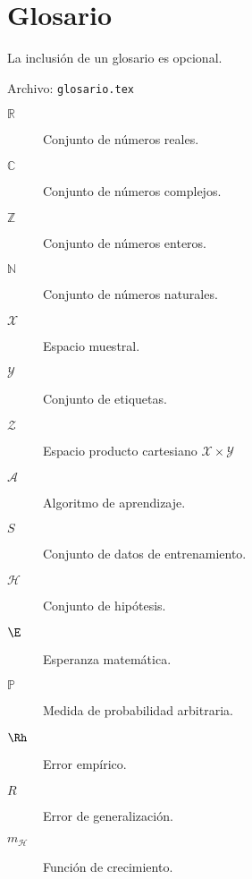 
\chapter*{Glosario}

La inclusión de un glosario es opcional.

Archivo: \texttt{glosario.tex}

\begin{description} 
  \item[$\mathbb{R}$] Conjunto de números reales.

  \item[$\mathbb{C}$] Conjunto de números complejos.

  \item[$\mathbb{Z}$] Conjunto de números enteros.
  
  \item[$\mathbb{N}$] Conjunto de números naturales.
  
  \item[$\mathcal{X}$] Espacio muestral.
  
  \item[$\mathcal{Y}$] Conjunto de etiquetas.
  
  \item[$\mathcal{Z}$] Espacio producto cartesiano $\mathcal{X} \times \mathcal{Y}$
  
  \item[$\mathcal{A}$] Algoritmo de aprendizaje.
  
  \item[$S$] Conjunto de datos de entrenamiento.
  
  \item[$\mathcal{H}$] Conjunto de hipótesis.
  
  \item[$\E$] Esperanza matemática.
  
  \item[$\mathbb{P}$] Medida de probabilidad arbitraria.
  
  \item[$\Rh$] Error empírico.
  
  \item[$R$] Error de generalización.
  
  \item[$m_{\mathcal{H}}$] Función de crecimiento.
  

  
\end{description}
\endinput
